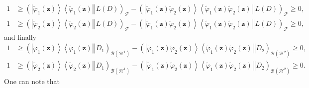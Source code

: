 \documentclass[aps,preprint]{revtex4}%
\begin{document}
\begin{align}
1  &  \geq\left(  \left.  \left\vert \tilde{\varphi}_{1}\left(  \mathbf{z}%
\right)  \right\rangle \left\langle \tilde{\varphi}_{1}\left(  \mathbf{z}%
\right)  \right\vert \right\vert L\left(  D\right)  \right)  _{\mathcal{F}%
}-\left(  \left.  \left\vert \tilde{\varphi}_{1}\left(  \mathbf{z}\right)
\tilde{\varphi}_{2}\left(  \mathbf{z}\right)  \right\rangle \left\langle
\tilde{\varphi}_{1}\left(  \mathbf{z}\right)  \tilde{\varphi}_{2}\left(
\mathbf{z}\right)  \right\vert \right\vert L\left(  D\right)  \right)
_{\mathcal{F}}\geq0,\nonumber\\
1  &  \geq\left(  \left.  \left\vert \tilde{\varphi}_{2}\left(  \mathbf{z}%
\right)  \right\rangle \left\langle \tilde{\varphi}_{2}\left(  \mathbf{z}%
\right)  \right\vert \right\vert L\left(  D\right)  \right)  _{\mathcal{F}%
}-\left(  \left.  \left\vert \tilde{\varphi}_{1}\left(  \mathbf{z}\right)
\tilde{\varphi}_{2}\left(  \mathbf{z}\right)  \right\rangle \left\langle
\tilde{\varphi}_{1}\left(  \mathbf{z}\right)  \tilde{\varphi}_{2}\left(
\mathbf{z}\right)  \right\vert \right\vert L\left(  D\right)  \right)
_{\mathcal{F}}\geq0,
\end{align}
and finally
\begin{align}
1  &  \geq\left(  \left.  \left\vert \tilde{\varphi}_{1}\left(  \mathbf{z}%
\right)  \right\rangle \left\langle \tilde{\varphi}_{1}\left(  \mathbf{z}%
\right)  \right\vert \right\vert D_{1}\right)  _{\mathcal{B}\left(
\mathcal{H}^{1}\right)  }-\left(  \left.  \left\vert \tilde{\varphi}%
_{1}\left(  \mathbf{z}\right)  \tilde{\varphi}_{2}\left(  \mathbf{z}\right)
\right\rangle \left\langle \tilde{\varphi}_{1}\left(  \mathbf{z}\right)
\tilde{\varphi}_{2}\left(  \mathbf{z}\right)  \right\vert \right\vert
D_{2}\right)  _{\mathcal{B}\left(  \mathcal{H}^{2}\right)  }\geq0,\nonumber\\
1  &  \geq\left(  \left.  \left\vert \tilde{\varphi}_{2}\left(  \mathbf{z}%
\right)  \right\rangle \left\langle \tilde{\varphi}_{2}\left(  \mathbf{z}%
\right)  \right\vert \right\vert D_{1}\right)  _{\mathcal{B}\left(
\mathcal{H}^{1}\right)  }-\left(  \left.  \left\vert \tilde{\varphi}%
_{1}\left(  \mathbf{z}\right)  \tilde{\varphi}_{2}\left(  \mathbf{z}\right)
\right\rangle \left\langle \tilde{\varphi}_{1}\left(  \mathbf{z}\right)
\tilde{\varphi}_{2}\left(  \mathbf{z}\right)  \right\vert \right\vert
D_{2}\right)  _{\mathcal{B}\left(  \mathcal{H}^{2}\right)  }\geq0.
\end{align}
One can note that
\end{document}
